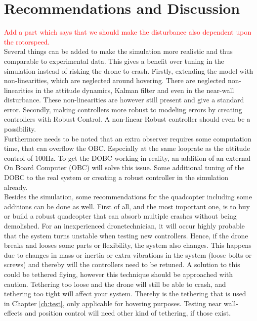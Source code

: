 \chapter{Recommendations and Discussion} \label{ch:disc}

\textcolor{red}{Add a part which says that we should make the disturbance also dependent upon the rotorspeed.}\\


Several things can be added to make the simulation more realistic and thus comparable to experimental data. This gives a benefit over tuning in the simulation instead of risking the drone to crash. Firstly, extending the model with non-linearities, which are neglected around hovering. There are neglected non-linearities in the attitude dynamics, Kalman filter and even in the near-wall disturbance. These non-linearities are however still present and give a standard error. Secondly, making controllers more robust to modeling errors by creating controllers with Robust Control. A non-linear Robust controller should even be a possibility.\\
Furthermore needs to be noted that an extra observer requires some computation time, that can overflow the OBC. Especially at the same looprate as the attitude control of $100$Hz. To get the DOBC working in reality, an addition of an external On Board Computer (OBC) will solve this issue. Some additional tuning of the DOBC to the real system or creating a robust controller in the simulation already.\\
Besides the simulation, some recommendations for the quadcopter including some additions can be done as well. First of all, and the most important one, is to buy or build a robust quadcopter that can absorb multiple crashes without being demolished. For an inexperienced dronetechnician, it will occur highly probable that the system turns unstable when testing new controllers. Hence, if the drone breaks and looses some parts or flexibility, the system also changes. This happens due to changes in mass or inertia or extra vibrations in the system (loose bolts or screws) and thereby will the controllers need to be retuned. A solution to this could be tethered flying, however this technique should be approached with caution. Tethering too loose and the drone will still be able to crash, and tethering too tight will affect your system. Thereby is the tethering that is used in Chapter \ref{ch:test}, only applicable for hovering purposes. Testing near wall-effects and position control will need other kind of tethering, if those exist.\\
